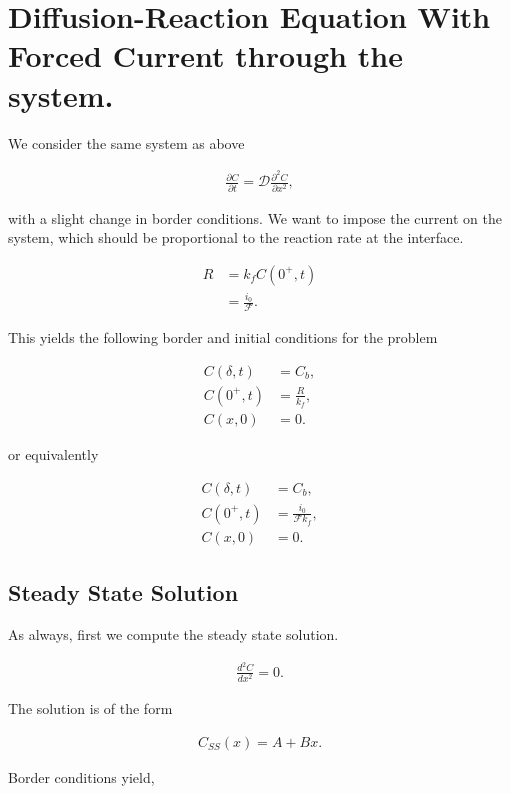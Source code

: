 
\section{Diffusion-Reaction Equation With Forced Current through the system.}
\label{appendix:forced-current-analytic}

We consider the same system as above

\begin{align}
	\frac{\partial C}{\partial t} = \mathcal{D}\frac{\partial^2 C}{\partial x^2},
\end{align}

with a slight change in border conditions. We want to impose the current on the system, which should be proportional to the reaction rate at the interface.

\begin{align}
	R &= k_f C(0^+, t)\\ 
	&= \frac{i_0}{\mathcal{F}}.
\end{align}

This yields the following border and initial conditions for the problem

\begin{align}
	C(\delta, t) &= C_b,\\
	C(0^+, t) &= \frac{R}{k_f},\\
	C(x, 0) &= 0.
\end{align}

or equivalently

\begin{align}
	C(\delta, t) &= C_b,\\
	C(0^+, t) &= \frac{i_0}{\mathcal{F}k_f},\\
	C(x, 0) &= 0.
\end{align}

\subsection{Steady State Solution}

As always, first we compute the steady state solution.

\begin{align}
	\frac{d ^2C}{d x^2} = 0.
\end{align}

The solution is of the form

\begin{align}
	C_{SS}(x) = A + Bx.
\end{align}

Border conditions yield,

